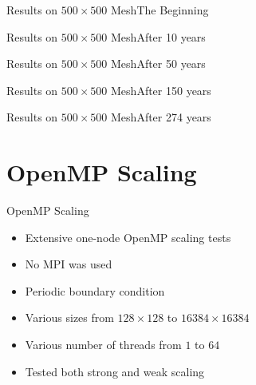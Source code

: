 \documentclass{beamer}
\begin{document}
\begin{frame}{Results on $500 \times 500$ Mesh}{The Beginning}
    \begin{center}
    \end{center}
\end{frame}

\begin{frame}{Results on $500 \times 500$ Mesh}{After 10 years}
    \begin{center}
    \end{center}
\end{frame}

\begin{frame}{Results on $500 \times 500$ Mesh}{After 50 years}
    \begin{center}
    \end{center}
\end{frame}

\begin{frame}{Results on $500 \times 500$ Mesh}{After 150 years}
    \begin{center}
    \end{center}
\end{frame}

\begin{frame}{Results on $500 \times 500$ Mesh}{After 274 years}
    \begin{center}
    \end{center}
\end{frame}

\section{OpenMP Scaling}

\begin{frame}{OpenMP Scaling}
    \begin{itemize}
        \item Extensive one-node OpenMP scaling tests
        \item No MPI was used
        \item Periodic boundary condition
        \item Various sizes from $128 \times 128$ to $16384 \times 16384$
        \item Various number of threads from $1$ to $64$
        \item Tested both strong and weak scaling 
    \end{itemize}
\end{frame}
\end{document}
